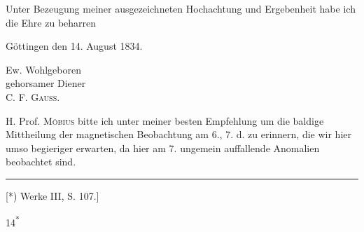 Unter Bezeugung meiner ausgezeichneten Hochachtung und Ergebenheit habe ich die Ehre zu beharren
\par\medskip
\noindent\begin{minipage}[c]{.52\linewidth}Göttingen den 14. August 1834.\end{minipage}\hfill
\begin{minipage}[c]{.45\linewidth}
\begin{center}Ew. Wohlgeboren\\gehorsamer Diener\\C. F. \textsc{Gauss}.\end{center}
\end{minipage}\par\medskip
\noindent\hspace*{\parindent}H. Prof. \textsc{Möbius} bitte ich unter meiner besten Empfehlung um
die baldige Mittheilung der magnetischen Beobachtung am 6., 7. d. zu erinnern, die wir hier umso
begieriger erwarten, da hier am 7. ungemein auffallende Anomalien beobachtet sind.
\par\smallskip\noindent\rule{.25\linewidth}{.4pt}\par\smallskip
{\small\noindent\hspace*{\parindent}[*) Werke III, S. 107.]\par}
\vfill\noindent\hfill 14\textsuperscript{*}\par
\clearpage
